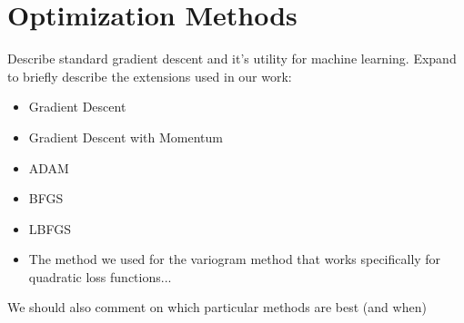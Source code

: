 \chapter{Optimization Methods}

Describe standard gradient descent and it's utility for machine learning. Expand to briefly describe the extensions used in our work:
\begin{itemize}
\item Gradient Descent
\item Gradient Descent with Momentum
\item ADAM
\item BFGS
\item LBFGS
\item The method we used for the variogram method that works specifically for quadratic loss functions...
\end{itemize}

We should also comment on which particular methods are best (and when)

